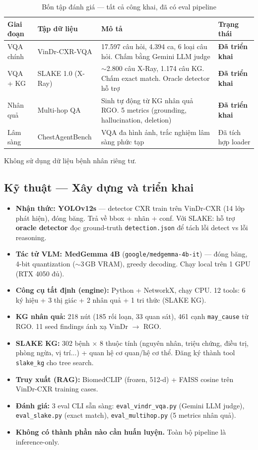 \documentclass[11pt,a4paper]{article}
\begin{document}
\begin{table}[H]
\centering\small
\begin{tabular}{l l p{5cm} l}
\toprule
\textbf{Giai đoạn} & \textbf{Tập dữ liệu} & \textbf{Mô tả} & \textbf{Trạng thái} \\
\midrule
VQA chính & VinDr-CXR-VQA & 17.597 câu hỏi, 4.394 ca, 6 loại câu hỏi. Chấm bằng Gemini LLM judge & \textbf{Đã triển khai} \\
VQA + KG & SLAKE 1.0 (X-Ray) & $\sim$2.800 câu X-Ray, 1.174 câu KG. Chấm exact match. Oracle detector hỗ trợ & \textbf{Đã triển khai} \\
Nhân quả & Multi-hop QA & Sinh tự động từ KG nhân quả RGO. 5 metrics (grounding, hallucination, deletion) & \textbf{Đã triển khai} \\
Lâm sàng & ChestAgentBench & VQA đa hình ảnh, trắc nghiệm lâm sàng phức tạp & Đã tích hợp loader \\
\bottomrule
\end{tabular}
\caption{Bốn tập đánh giá --- tất cả công khai, đã có eval pipeline}
\end{table}

Không sử dụng dữ liệu bệnh nhân riêng tư.

\subsection{Kỹ thuật --- Xây dựng và triển khai}

\begin{itemize}[leftmargin=1.5em]
  \item \textbf{Nhận thức: YOLOv12s} --- detector CXR train trên VinDr-CXR (14 lớp phát hiện), đóng băng. Trả về bbox + nhãn + conf. Với SLAKE: hỗ trợ \textbf{oracle detector} đọc ground-truth \texttt{detection.json} để tách lỗi detect vs lỗi reasoning.
  \item \textbf{Tác tử VLM: MedGemma 4B} (\texttt{google/medgemma-4b-it}) --- đóng băng, 4-bit quantization ($\sim$3\,GB VRAM), greedy decoding. Chạy local trên 1 GPU (RTX 4050 đủ).
  \item \textbf{Công cụ tất định (engine):} Python + NetworkX, chạy CPU. 12 tools: 6 ký hiệu + 3 thị giác + 2 nhân quả + 1 tri thức (SLAKE KG).
  \item \textbf{KG nhân quả:} 218 nút (185 rối loạn, 33 quan sát), 461 cạnh \texttt{may\_cause} từ RGO. 11 seed findings ánh xạ VinDr $\to$ RGO.
  \item \textbf{SLAKE KG:} 302 bệnh $\times$ 8 thuộc tính (nguyên nhân, triệu chứng, điều trị, phòng ngừa, vị trí...) + quan hệ cơ quan/hệ cơ thể. Đăng ký thành tool \texttt{slake\_kg} cho tree search.
  \item \textbf{Truy xuất (RAG):} BiomedCLIP (frozen, 512-d) + FAISS cosine trên VinDr-CXR training cases.
  \item \textbf{Đánh giá:} 3 eval CLI sẵn sàng: \texttt{eval\_vindr\_vqa.py} (Gemini LLM judge), \texttt{eval\_slake.py} (exact match), \texttt{eval\_multihop.py} (5 metrics nhân quả).
  \item \textbf{Không có thành phần nào cần huấn luyện.} Toàn bộ pipeline là inference-only.
\end{itemize}
\end{document}
